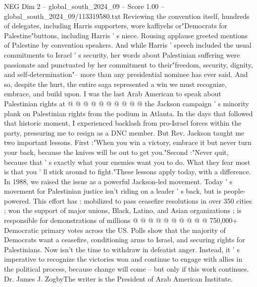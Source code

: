 \begin{textsample}{NEG Dim 2 – global\_south\_2024\_09 – Score 1.00 – global\_south\_2024\_09/113319580.txt}
Reviewing the convention itself, hundreds of delegates, including Harris supporters, wore kaffiyehs or"Democrats for Palestine"buttons, including Harris ' s niece.
Rousing applause greeted mentions of Palestine by convention speakers.
And while Harris ' speech included the usual commitments to Israel ' s security, her words about Palestinian suffering were passionate and punctuated by her commitment to their"freedom, security, dignity, and self-determination"-- more than any presidential nominee has ever said.
And so, despite the hurt, the entire saga represented a win we must recognize, embrace, and build upon.
I was the last Arab American to speak about Palestinian rights at @ @ @ @ @ @ @ @ @ @ the Jackson campaign ' s minority plank on Palestinian rights from the podium in Atlanta.
In the days that followed that historic moment, I experienced backlash from pro-Israel forces within the party, pressuring me to resign as a DNC member.
But Rev.
Jackson taught me two important lessons.
First :"When you win a victory, embrace it but never turn your back, because the knives will be out to get you."Second :"Never quit, because that ' s exactly what your enemies want you to do.
What they fear most is that you ' ll stick around to fight."These lessons apply today, with a difference.
In 1988, we raised the issue as a powerful Jackson-led movement.
Today ' s movement for Palestinian justice isn't riding on a leader ' s back, but is people-powered.
This effort has : mobilized to pass ceasefire resolutions in over 350 cities ; won the support of major unions, Black, Latino, and Asian organizations ; is responsible for demonstrations of millions @ @ @ @ @ @ @ @ @ @ 750,000+ Democratic primary votes across the US.
Polls show that the majority of Democrats want a ceasefire, conditioning arms to Israel, and securing rights for Palestinians.
Now isn't the time to withdraw in defeatist anger.
Instead, it ' s imperative to recognize the victories won and continue to engage with allies in the political process, because change will come -- but only if this work continues.
Dr.
James J.
ZogbyThe writer is the President of Arab American Institute.

\end{textsample}
